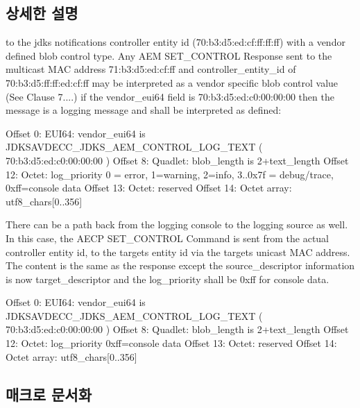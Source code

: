 \subsection{상세한 설명}
to the jdks notifications controller entity id (70\+:b3\+:d5\+:ed\+:cf\+:ff\+:ff\+:ff) with a vendor defined blob control type. Any A\+EM S\+E\+T\+\_\+\+C\+O\+N\+T\+R\+OL Response sent to the multicast M\+AC address 71\+:b3\+:d5\+:ed\+:cf\+:ff and controller\+\_\+entity\+\_\+id of 70\+:b3\+:d5\+:ff\+:ff\+:ed\+:cf\+:ff may be interpreted as a vendor specific blob control value (See Clause 7....) if the vendor\+\_\+eui64 field is 70\+:b3\+:d5\+:ed\+:c0\+:00\+:00\+:00 then the message is a logging message and shall be interpreted as defined\+: \begin{DoxyVerb}Offset  0:  EUI64: vendor_eui64 is JDKSAVDECC_JDKS_AEM_CONTROL_LOG_TEXT ( 70:b3:d5:ed:c0:00:00:00 )
Offset  8:  Quadlet: blob_length is 2+text_length
Offset 12:  Octet: log_priority { 0 = error, 1=warning, 2=info, 3..0x7f = debug/trace, 0xff=console data }
Offset 13:  Octet: reserved
Offset 14:  Octet array: utf8_chars[0..356]
\end{DoxyVerb}


There can be a path back from the logging console to the logging source as well. In this case, the A\+E\+CP S\+E\+T\+\_\+\+C\+O\+N\+T\+R\+OL Command is sent from the actual controller entity id, to the targets entity id via the targets unicast M\+AC address. The content is the same as the response except the source\+\_\+descriptor information is now target\+\_\+descriptor and the log\+\_\+priority shall be 0xff for console data. \begin{DoxyVerb} Offset  0:  EUI64: vendor_eui64 is JDKSAVDECC_JDKS_AEM_CONTROL_LOG_TEXT ( 70:b3:d5:ed:c0:00:00:00 )
 Offset  8:  Quadlet: blob_length is 2+text_length
 Offset 12:  Octet: log_priority { 0xff=console data }
 Offset 13:  Octet: reserved
 Offset 14:  Octet array: utf8_chars[0..356]\end{DoxyVerb}


\subsection{매크로 문서화}
